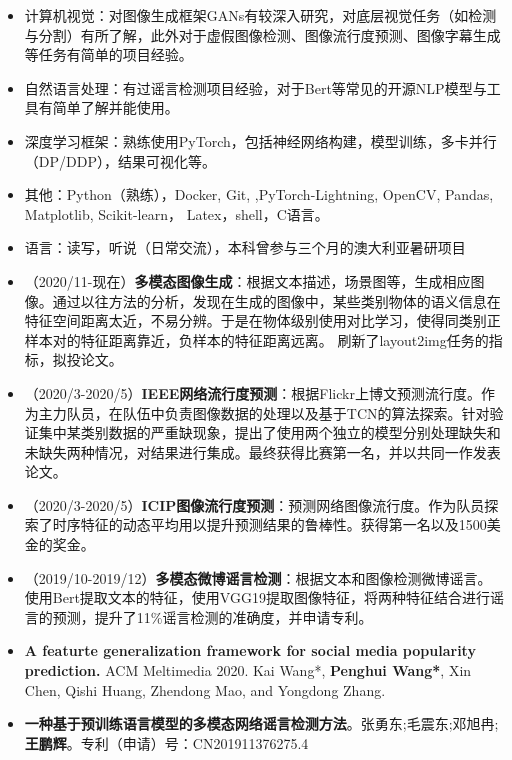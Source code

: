 \documentclass[zh]{resume}
\begin{document}
\begin{itemize}
  \item 计算机视觉：对图像生成框架GANs有较深入研究，对底层视觉任务（如检测与分割）有所了解，此外对于虚假图像检测、图像流行度预测、图像字幕生成等任务有简单的项目经验。
  \item 自然语言处理：有过谣言检测项目经验，对于Bert等常见的开源NLP模型与工具有简单了解并能使用。
  \item 深度学习框架：熟练使用PyTorch，包括神经网络构建，模型训练，多卡并行（DP/DDP），结果可视化等。
  \item 其他：Python（熟练），Docker, Git, ,PyTorch-Lightning, OpenCV, Pandas, Matplotlib, Scikit-learn， Latex，shell，C语言。
  \item 语言：读写，听说（日常交流），本科曾参与三个月的澳大利亚暑研项目
\end{itemize}

\begin{itemize}
  \item  （2020/11-现在）\textbf{多模态图像生成}：根据文本描述，场景图等，生成相应图像。通过以往方法的分析，发现在生成的图像中，某些类别物体的语义信息在特征空间距离太近，不易分辨。于是在物体级别使用对比学习，使得同类别正样本对的特征距离靠近，负样本的特征距离远离。 刷新了layout2img任务的指标，拟投论文。
  \item （2020/3-2020/5）\textbf{IEEE网络流行度预测}：根据Flickr上博文预测流行度。作为主力队员，在队伍中负责图像数据的处理以及基于TCN的算法探索。针对验证集中某类别数据的严重缺现象，提出了使用两个独立的模型分别处理缺失和未缺失两种情况，对结果进行集成。最终获得比赛第一名，并以共同一作发表论文。
  \item （2020/3-2020/5）\textbf{ICIP图像流行度预测}：预测网络图像流行度。作为队员探索了时序特征的动态平均用以提升预测结果的鲁棒性。获得第一名以及1500美金的奖金。
  \item （2019/10-2019/12）\textbf{多模态微博谣言检测}：根据文本和图像检测微博谣言。使用Bert提取文本的特征，使用VGG19提取图像特征，将两种特征结合进行谣言的预测，提升了11$\%$谣言检测的准确度，并申请专利。

\end{itemize}

\begin{itemize}
  \item \textbf{A featurte generalization framework for social media popularity prediction.} ACM Meltimedia 2020. 
  Kai Wang*, \textbf{Penghui Wang*}, Xin Chen, Qishi Huang, Zhendong Mao, and Yongdong Zhang.
  \item \textbf{一种基于预训练语言模型的多模态网络谣言检测方法}。张勇东;毛震东;邓旭冉;\textbf{王鹏辉}。专利（申请）号：CN201911376275.4

\end{itemize}
\end{document}
